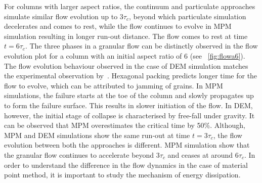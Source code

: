 For columns with larger aspect ratios, the continuum and particulate approaches 
simulate similar flow evolution up to 3$\tau_{c}$, beyond 
which particulate simulation decelerates and comes to rest, while the flow 
continues to evolve in MPM simulation resulting in longer run-out distance. 
The flow comes to rest at time $\textit{t}=6\tau_{c}$. The 
three phases in a granular flow can be distinctly observed in the flow 
evolution plot for a column with an initial aspect ratio of 6 (see 
~\cref{fig:flowa6}). The flow evolution 
behaviour observed in the case of DEM simulation matches the experimental 
observation by~\citet{Lajeunesse2004}. Hexagonal packing predicts longer time 
for the flow to evolve, which can be attributed to jamming of grains. 
In MPM simulations, the failure starts at the toe of the column and slowly 
propagates up to form the failure surface. This results in slower initiation of 
the flow. In DEM, however, the initial stage of collapse is characterised by 
free-fall under gravity. It can be observed that MPM overestimates the critical 
time by 50\%. Although, MPM and DEM simulations show the same run-out at time 
$\textit{t}=3\tau_{c}$, the flow evolution between both the approaches is 
different. MPM simulation show that the granular flow continues to accelerate 
beyond $3\tau_c$ and ceases at around $6\tau_{c}$. In order to understand the 
difference in the flow dynamics in the case of material point method, it is 
important to study the mechanism of energy dissipation. 


